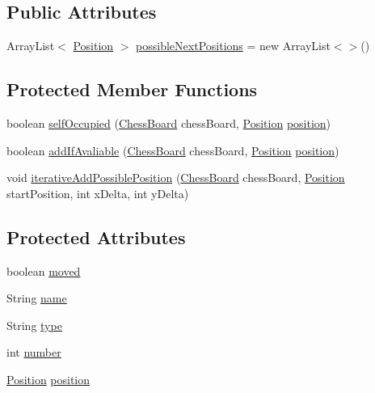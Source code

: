 \subsection*{Public Attributes}
\begin{DoxyCompactItemize}
\item 
Array\+List$<$ \hyperlink{classmodel_core_1_1_position}{Position} $>$ \hyperlink{classmodel_chess_pieces_1_1_chess_piece_aa477ac8d33b4e7c98eb6f4aec2390477}{possible\+Next\+Positions} = new Array\+List$<$$>$()
\end{DoxyCompactItemize}
\subsection*{Protected Member Functions}
\begin{DoxyCompactItemize}
\item 
boolean \hyperlink{classmodel_chess_pieces_1_1_chess_piece_a8045974b8d8f1e88722cd54b050774c5}{self\+Occupied} (\hyperlink{classmodel_core_1_1_chess_board}{Chess\+Board} chess\+Board, \hyperlink{classmodel_core_1_1_position}{Position} \hyperlink{classmodel_chess_pieces_1_1_chess_piece_a3d4362d5b28f6edb14161196d9c6807d}{position})
\item 
boolean \hyperlink{classmodel_chess_pieces_1_1_chess_piece_a247db1a354f7792b0a79b8128629a1c5}{add\+If\+Avaliable} (\hyperlink{classmodel_core_1_1_chess_board}{Chess\+Board} chess\+Board, \hyperlink{classmodel_core_1_1_position}{Position} \hyperlink{classmodel_chess_pieces_1_1_chess_piece_a3d4362d5b28f6edb14161196d9c6807d}{position})
\item 
void \hyperlink{classmodel_chess_pieces_1_1_chess_piece_a86900a063a4596d7445e8bd2af895445}{iterative\+Add\+Possible\+Position} (\hyperlink{classmodel_core_1_1_chess_board}{Chess\+Board} chess\+Board, \hyperlink{classmodel_core_1_1_position}{Position} start\+Position, int x\+Delta, int y\+Delta)
\end{DoxyCompactItemize}
\subsection*{Protected Attributes}
\begin{DoxyCompactItemize}
\item 
boolean \hyperlink{classmodel_chess_pieces_1_1_chess_piece_a5bc0722badda5dc066b6a73476fc933c}{moved}
\item 
String \hyperlink{classmodel_chess_pieces_1_1_chess_piece_a03d2fb76fbbff0dab72d00f2173a69ff}{name}
\item 
String \hyperlink{classmodel_chess_pieces_1_1_chess_piece_a195487ca88c197af7c1604247be31db2}{type}
\item 
int \hyperlink{classmodel_chess_pieces_1_1_chess_piece_a979e63b99128333883acedc38d25dc87}{number}
\item 
\hyperlink{classmodel_core_1_1_position}{Position} \hyperlink{classmodel_chess_pieces_1_1_chess_piece_a3d4362d5b28f6edb14161196d9c6807d}{position}
\end{DoxyCompactItemize}


